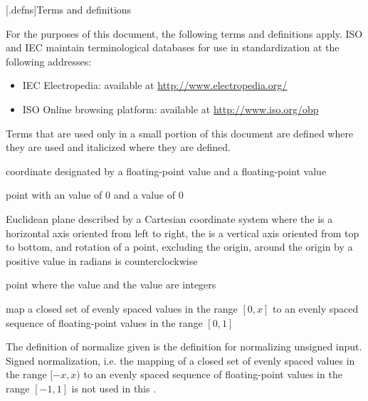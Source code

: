
[\iotwod.defns]{Terms and definitions}

%
For the purposes of this document, the following terms and definitions apply.
ISO and IEC maintain terminological databases for use in standardization at the following addresses:
\begin{itemize}
\renewcommand{\labelitemi}{$\bullet$} %
\item IEC Electropedia: available at \url{http://www.electropedia.org/}
\item ISO Online browsing platform: available at \url{http://www.iso.org/obp}
\end{itemize}

\pnum
Terms that are used only in a small portion of this document are defined where they are used and italicized where they are defined.

%
coordinate designated by a floating-point \xaxis{} value and a floating-point \yaxis{} value

%
point with an \xaxis{} value of $0$ and a \yaxis{} value of $0$

%
Euclidean plane described by a Cartesian coordinate system where the \xaxis{} is a horizontal axis oriented from left to right, the \yaxis{} is a vertical axis oriented from top to bottom, and rotation of a point, excluding the origin, around the origin by a positive value in radians is counterclockwise

%
point where the \xaxis{} value and the \yaxis{} value are integers

%
map a closed set of evenly spaced values in the range $[0, x]$ to an evenly spaced sequence of floating-point values in the range $[0, 1]$
\begin{note}
The definition of normalize given is the definition for normalizing unsigned input. Signed normalization, i.e. the mapping of a closed set of evenly spaced values in the range $[-x, x)$ to an evenly spaced sequence of floating-point values in the range $[-1, 1]$ is not used in this \documenttypename{}.
\end{note}

